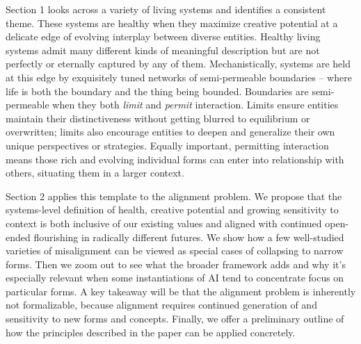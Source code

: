 \documentclass[12pt]{article}
\begin{document}
Section 1 looks across a variety of living systems and identifies a consistent theme. These systems are healthy when they maximize creative potential at a delicate edge of evolving interplay between diverse entities. Healthy living systems admit many different kinds of meaningful description but are not perfectly or eternally captured by any of them. Mechanistically, systems are held at this edge by exquisitely tuned networks of semi-permeable boundaries -- where life is both the boundary and the thing being bounded. Boundaries are semi-permeable when they both \textit{limit} and \textit{permit} interaction. Limits ensure entities maintain their distinctiveness without getting blurred to equilibrium or overwritten; limits also encourage entities to deepen and generalize their own unique perspectives or strategies. Equally important, permitting interaction means those rich and evolving individual forms can enter into relationship with others, situating them in a larger context. 

Section 2 applies this template to the alignment problem. We propose that the systems-level definition of health, creative potential and growing sensitivity to context is both inclusive of our existing values and aligned with continued open-ended flourishing in radically different futures. We show how a few well-studied varieties of misalignment can be viewed as special cases of collapsing to narrow forms. Then we zoom out to see what the broader framework adds and why it's especially relevant when some instantiations of AI tend to concentrate focus on particular forms. A key takeaway will be that the alignment problem is inherently not formalizable, because alignment requires continued generation of and sensitivity to new forms and concepts. Finally, we offer a preliminary outline of how the principles described in the paper can be applied concretely.

\end{document}
